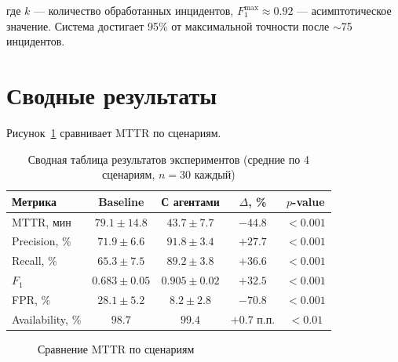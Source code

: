 где $k$ --- количество обработанных инцидентов, $F_1^{\max} \approx 0.92$ --- асимптотическое значение. Система достигает 95\% от максимальной точности после $\sim$75 инцидентов.

\section{Сводные результаты}

Рисунок~\ref{fig:mttr_comparison} сравнивает MTTR по сценариям.

\begin{table}[H]
\centering
\small
\caption{Сводная таблица результатов экспериментов (средние по 4 сценариям, $n = 30$ каждый)}
\label{tab:experiments_summary}
\begin{tabular}{|l|c|c|c|c|}
\hline
\textbf{Метрика} & \textbf{Baseline} & \textbf{С агентами} & \textbf{$\Delta$, \%} & \textbf{$p$-value} \\
\hline
MTTR, мин & $79.1 \pm 14.8$ & $43.7 \pm 7.7$ & $-44.8$ & $< 0.001$ \\
\hline
Precision, \% & $71.9 \pm 6.6$ & $91.8 \pm 3.4$ & $+27.7$ & $< 0.001$ \\
\hline
Recall, \% & $65.3 \pm 7.5$ & $89.2 \pm 3.8$ & $+36.6$ & $< 0.001$ \\
\hline
$F_1$ & $0.683 \pm 0.05$ & $0.905 \pm 0.02$ & $+32.5$ & $< 0.001$ \\
\hline
FPR, \% & $28.1 \pm 5.2$ & $8.2 \pm 2.8$ & $-70.8$ & $< 0.001$ \\
\hline
Availability, \% & $98.7$ & $99.4$ & $+0.7$ п.п. & $< 0.01$ \\
\hline
\end{tabular}
\end{table}

\begin{figure}[H]
\centering
{}
\caption{Сравнение MTTR по сценариям}
\label{fig:mttr_comparison}
\end{figure}


